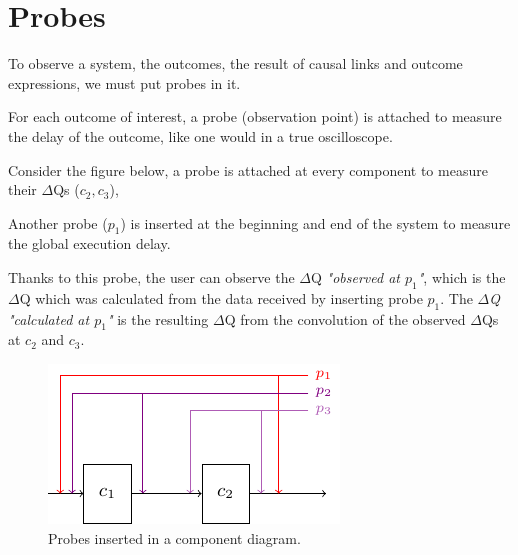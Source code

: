 \section{Probes}

To observe a system, the outcomes, the result of causal links and outcome expressions, we must put probes in it.

For each outcome of interest, a probe (observation point) is attached to measure the delay of the outcome, like one would in a true oscilloscope. 

Consider the figure below, a probe is attached at every component to measure their $\Delta$Qs ($c_2, c_3$), 

Another probe ($p_1$) is inserted at the beginning and end of the system to measure the global execution delay. 

Thanks to this probe, the user can observe the $\Delta$Q \textit{"observed at $p_1$"}, which is the $\Delta$Q which was calculated from the data received by inserting probe $p_1$. The \textit{$\Delta$Q "calculated at $p_1$"} is the resulting $\Delta$Q from the convolution of the observed $\Delta$Qs at $c_2$ and $c_3$.   
    \begin{figure}[H]
        \begin{center}
            \includegraphics[scale=1.8]{tikz/probes.pdf}
        \end{center}
        \caption{Probes inserted in a component diagram.}
        \label{fig:probes}
    \end{figure}




